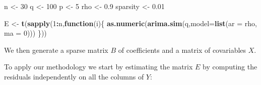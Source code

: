 \documentclass[]{article}
\newenvironment{Shaded}{\begin{snugshade}}{\end{snugshade}}
\newcommand{\KeywordTok}[1]{\textcolor[rgb]{0.13,0.29,0.53}{\textbf{#1}}}
\newcommand{\DataTypeTok}[1]{\textcolor[rgb]{0.13,0.29,0.53}{#1}}
\newcommand{\DecValTok}[1]{\textcolor[rgb]{0.00,0.00,0.81}{#1}}
\newcommand{\FloatTok}[1]{\textcolor[rgb]{0.00,0.00,0.81}{#1}}
\newcommand{\StringTok}[1]{\textcolor[rgb]{0.31,0.60,0.02}{#1}}
\newcommand{\ControlFlowTok}[1]{\textcolor[rgb]{0.13,0.29,0.53}{\textbf{#1}}}
\newcommand{\OperatorTok}[1]{\textcolor[rgb]{0.81,0.36,0.00}{\textbf{#1}}}
\newcommand{\NormalTok}[1]{#1}
\begin{document}
\begin{Shaded}
\begin{Highlighting}[]
\NormalTok{n <-}\StringTok{ }\DecValTok{30}
\NormalTok{q <-}\StringTok{ }\DecValTok{100}
\NormalTok{p <-}\StringTok{ }\DecValTok{5}
\NormalTok{rho <-}\StringTok{ }\FloatTok{0.9}
\NormalTok{sparsity <-}\StringTok{ }\FloatTok{0.01}

\NormalTok{E <-}\StringTok{ }\KeywordTok{t}\NormalTok{(}\KeywordTok{sapply}\NormalTok{(}\DecValTok{1}\OperatorTok{:}\NormalTok{n,}\ControlFlowTok{function}\NormalTok{(i)\{}
  \KeywordTok{as.numeric}\NormalTok{(}\KeywordTok{arima.sim}\NormalTok{(q,}\DataTypeTok{model=}\KeywordTok{list}\NormalTok{(}\DataTypeTok{ar =}\NormalTok{ rho, }\DataTypeTok{ma =} \DecValTok{0}\NormalTok{)))}
\NormalTok{\}))}
\end{Highlighting}
\end{Shaded}

We then generate a sparse matrix \(B\) of coefficients and a matrix of
covariables \(X\).

\begin{Shaded}
\end{Shaded}

To apply our methodology we start by estimating the matrix \(E\) by
computing the residuals independently on all the columns of \(Y\):
\end{document}
